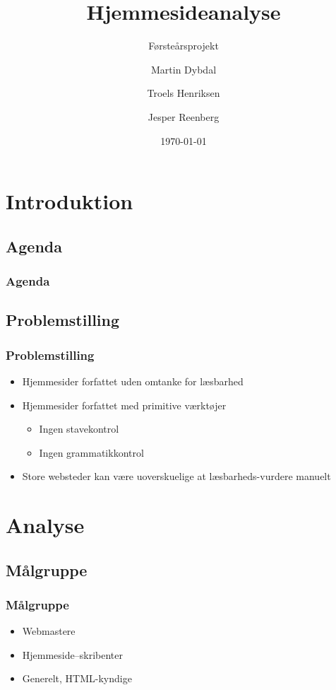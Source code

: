 \documentclass{beamer}
\title{Hjemmesideanalyse}
\subtitle{Førsteårsprojekt}
\author{Martin Dybdal \and Troels Henriksen \and Jesper Reenberg}
\institute{\textrm{Datalogisk Institut, Københavns Universitet}}
\date{\today}
\begin{document}
\frame{\titlepage}


\section{Introduktion}
\subsection{Agenda}
\begin{frame}
  \frametitle{Agenda}
  \tableofcontents
\end{frame}

\subsection{Problemstilling}
\begin{frame}
  \frametitle{Problemstilling}

  \begin{itemize}
  \item<1-> Hjemmesider forfattet uden omtanke for læsbarhed
  \item<2-> Hjemmesider forfattet med primitive værktøjer
    \begin{itemize}
      \item<2-> Ingen stavekontrol
      \item<2-> Ingen grammatikkontrol
    \end{itemize}
  \item<3-> Store websteder kan være uoverskuelige at læsbarheds-vurdere manuelt
  \end{itemize}
\end{frame}

\section{Analyse} %
\subsection{Målgruppe}
\begin{frame}
  \frametitle{Målgruppe}
  \begin{itemize}
  \item<1-> Webmastere
  \item<2-> Hjemmeside--skribenter
  \item<3-> Generelt, HTML-kyndige
  \end{itemize}

\end{frame}
\end{document}
